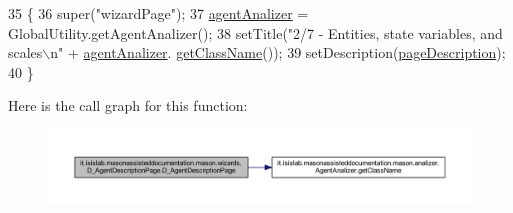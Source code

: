 \begin{DoxyCode}
35                                     \{
36         super(\textcolor{stringliteral}{"wizardPage"});
37         \hyperlink{classit_1_1isislab_1_1masonassisteddocumentation_1_1mason_1_1wizards_1_1_d___agent_description_page_a3551237b74a669c361623caa219af9d7}{agentAnalizer} = GlobalUtility.getAgentAnalizer();
38         setTitle(\textcolor{stringliteral}{"2/7 - Entities, state variables, and scales\(\backslash\)n"} + \hyperlink{classit_1_1isislab_1_1masonassisteddocumentation_1_1mason_1_1wizards_1_1_d___agent_description_page_a3551237b74a669c361623caa219af9d7}{agentAnalizer}.
      \hyperlink{classit_1_1isislab_1_1masonassisteddocumentation_1_1mason_1_1analizer_1_1_agent_analizer_a94492199c5e4873a07a2a46d15617937}{getClassName}());
39         setDescription(\hyperlink{classit_1_1isislab_1_1masonassisteddocumentation_1_1mason_1_1wizards_1_1_d___agent_description_page_a28540e2ea308e26ef8e80ba9d4848443}{pageDescription});
40     \}
\end{DoxyCode}


Here is the call graph for this function\-:\nopagebreak
\begin{figure}[H]
\begin{center}
\leavevmode
\includegraphics[width=350pt]{classit_1_1isislab_1_1masonassisteddocumentation_1_1mason_1_1wizards_1_1_d___agent_description_page_aee37d48e42e4d6f95404e42ecfd04e6d_cgraph}
\end{center}
\end{figure}




